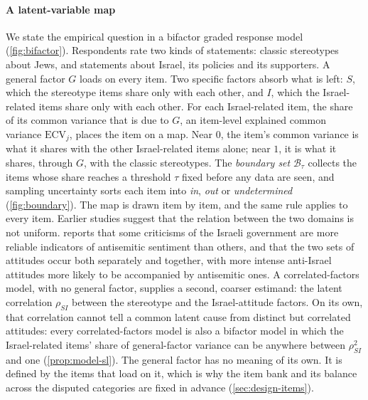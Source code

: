 \paragraph{A latent-variable map}
We state the empirical question in a bifactor graded response model
(\cref{fig:bifactor}). Respondents rate two kinds of statements: classic
stereotypes about Jews, and statements about Israel, its policies and its
supporters. A general factor $G$ loads on every item. Two specific factors
absorb what is left: $S$, which the stereotype items share only with each
other, and $I$, which the Israel-related items share only with each other.
For each Israel-related item, the share of its common variance that is due to
$G$, an item-level explained common variance $\mathrm{ECV}_j$, places the
item on a map. Near $0$, the item's common variance is what it shares with
the other Israel-related items alone; near $1$, it is what it shares, through
$G$, with the classic stereotypes. The \emph{boundary set} $\mathcal{B}_\tau$
collects the items whose share reaches a threshold $\tau$ fixed before any
data are seen, and sampling uncertainty sorts each item into \emph{in},
\emph{out} or \emph{undetermined} (\cref{fig:boundary}). The map is drawn
item by item, and the same rule applies to every item. Earlier studies
suggest that the relation between the two domains is not uniform.
 reports that some criticisms of the Israeli government
are more reliable indicators of antisemitic sentiment than others, and
\citet{staetsky2017} that the two sets of attitudes occur both separately and
together, with more intense anti-Israel attitudes more likely to be
accompanied by antisemitic ones. A correlated-factors model, with no general
factor, supplies a second, coarser estimand: the latent correlation
$\rho_{SI}$ between the stereotype and the Israel-attitude factors. On its
own, that correlation cannot tell a common latent cause from distinct but
correlated attitudes: every correlated-factors model is also a bifactor model
in which the Israel-related items' share of general-factor variance can be
anywhere between $\rho_{SI}^2$ and one (\cref{prop:model-sl}). The general
factor has no meaning of its own. It is defined by the items that load on it,
which is why the item bank and its balance across the disputed categories are
fixed in advance (\cref{sec:design-items}).

%
